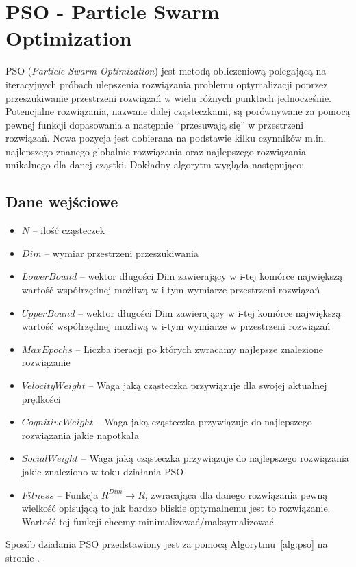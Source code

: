 \documentclass{../llncs_template/llncs}
\begin{document}
\section{PSO - Particle Swarm Optimization}

PSO (\emph{Particle Swarm Optimization}) jest metodą obliczeniową polegającą na iteracyjnych próbach ulepszenia rozwiązania problemu optymalizacji poprzez przeszukiwanie przestrzeni rozwiązań w wielu różnych punktach jednocześnie. Potencjalne rozwiązania, nazwane dalej cząsteczkami, są porównywane za pomocą pewnej funkcji dopasowania a następnie “przesuwają się” w przestrzeni rozwiązań. Nowa pozycja jest dobierana na podstawie kilku czynników m.in. najlepszego znanego globalnie rozwiązania oraz najlepszego rozwiązania unikalnego dla danej cząstki. Dokładny algorytm wygląda następująco:

\subsection*{Dane wejściowe}
\begin{itemize}
\item $N$ -- ilość cząsteczek
\item $Dim$ -- wymiar przestrzeni przeszukiwania
\item $LowerBound$ -- wektor długości Dim zawierający w i-tej komórce największą wartość współrzędnej możliwą w i-tym wymiarze przestrzeni rozwiązań
\item $UpperBound$ -- wektor długości Dim zawierający w i-tej komórce największą wartość współrzędnej możliwą w i-tym wymiarze w przestrzeni rozwiązań
\item $MaxEpochs$ -- Liczba iteracji po których zwracamy najlepsze znalezione rozwiązanie
\item $VelocityWeight$ -- Waga jaką cząsteczka przywiązuje dla swojej aktualnej prędkości
\item $CognitiveWeight$ -- Waga jaką cząsteczka przywiązuje do najlepszego rozwiązania jakie napotkała
\item $SocialWeight$ -- Waga jaką cząsteczka przywiązuje do najlepszego rozwiązania jakie znaleziono w toku działania PSO
\item $Fitness$ -- Funkcja $R^{Dim} \rightarrow R$, zwracająca dla danego rozwiązania pewną wielkość opisującą to jak bardzo bliskie optymalnemu jest to rozwiązanie. Wartość tej funkcji chcemy minimalizować/maksymalizować. 
\end{itemize}

Sposób działania PSO przedstawiony jest za pomocą Algorytmu~\ref{alg:pso} na stronie \pageref{alg:pso}.
\end{document}
